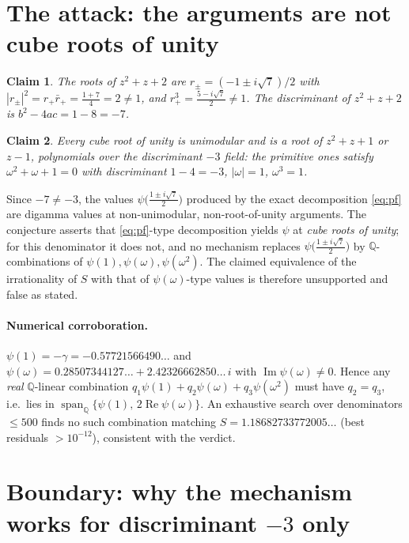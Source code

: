\documentclass[11pt]{article}
\newtheorem{claim}{Claim}
\newcommand{\ii}{\ensuremath{i}}
\newcommand{\ps}{\psi}
\begin{document}
\section{The attack: the arguments are not cube roots of unity}

\begin{claim}\label{cl:root}
The roots of $z^2+z+2$ are $r_\pm=(-1\pm\ii\sqrt7)/2$ with
$|r_\pm|^2=r_+\bar r_+=\tfrac{1+7}{4}=2\ne 1$, and $r_+^3=\tfrac{5-\ii\sqrt7}{2}\ne 1$.
The discriminant of $z^2+z+2$ is $b^2-4ac=1-8=-7$.
\end{claim}

\begin{claim}\label{cl:unity}
Every cube root of unity is unimodular and is a root of $z^2+z+1$ or $z-1$, polynomials over
the discriminant $-3$ field: the primitive ones satisfy $\omega^2+\omega+1=0$ with
discriminant $1-4=-3$, $|\omega|=1$, $\omega^3=1$.
\end{claim}

Since $-7\ne -3$, the values $\ps\bigl(\tfrac{1\pm\ii\sqrt7}{2}\bigr)$ produced by the exact
decomposition \eqref{eq:pf} are digamma values at non-unimodular, non-root-of-unity arguments.
The conjecture asserts that \eqref{eq:pf}-type decomposition yields $\ps$ at \emph{cube roots of
unity}; for this denominator it does not, and no mechanism replaces
$\ps\bigl(\tfrac{1\pm\ii\sqrt7}{2}\bigr)$ by $\mathbb{Q}$-combinations of
$\ps(1),\ps(\omega),\ps(\omega^2)$. The claimed equivalence of the irrationality of $S$ with that
of $\ps(\omega)$-type values is therefore unsupported and false as stated.

\paragraph{Numerical corroboration.}
$\ps(1)=-\gamma=-0.57721566490\ldots$ and
$\ps(\omega)=0.28507344127\ldots+2.42326662850\ldots\,\ii$ with
$\operatorname{Im}\ps(\omega)\ne0$. Hence any \emph{real} $\mathbb{Q}$-linear combination
$q_1\ps(1)+q_2\ps(\omega)+q_3\ps(\omega^2)$ must have $q_2=q_3$, i.e.\ lies in
$\operatorname{span}_{\mathbb Q}\{\ps(1),\,2\operatorname{Re}\ps(\omega)\}$. An exhaustive search
over denominators $\le 500$ finds no such combination matching
$S=1.18682733772005\ldots$ (best residuals $>10^{-12}$), consistent with the verdict.

\section{Boundary: why the mechanism works for discriminant $-3$ only}
\end{document}
